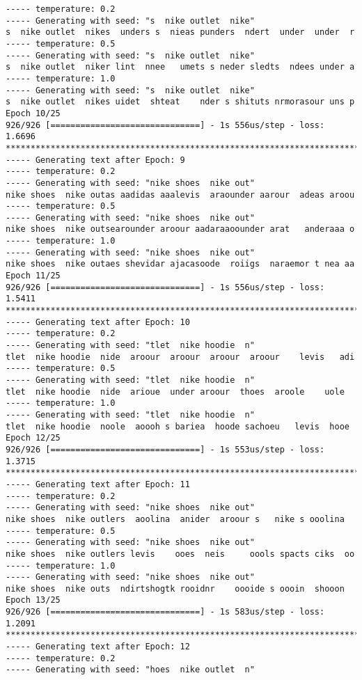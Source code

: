\documentclass[11pt]{article}
\begin{document}
\begin{Verbatim}[commandchars=\\\{\}]
----- temperature: 0.2
----- Generating with seed: "s  nike outlet  nike"
s  nike outlet  nikes  unders s  nieas punders  ndert  under  under  r
----- temperature: 0.5
----- Generating with seed: "s  nike outlet  nike"
s  nike outlet  niker lint  nnee   umets s neder sledts  ndees under a
----- temperature: 1.0
----- Generating with seed: "s  nike outlet  nike"
s  nike outlet  nikes uidet  shteat    nder s shituts nrmorasour uns p
Epoch 10/25
926/926 [==============================] - 1s 556us/step - loss: 1.6696
****************************************************************************
----- Generating text after Epoch: 9
----- temperature: 0.2
----- Generating with seed: "nike shoes  nike out"
nike shoes  nike outas aadidas aaalevis  araounder aarour  adeas aroou
----- temperature: 0.5
----- Generating with seed: "nike shoes  nike out"
nike shoes  nike outsearounder aroour aadaraaoounder arat   anderaaa o
----- temperature: 1.0
----- Generating with seed: "nike shoes  nike out"
nike shoes  nike outaes shevidar ajacasoode  roiigs  naraemor t nea aa
Epoch 11/25
926/926 [==============================] - 1s 556us/step - loss: 1.5411
****************************************************************************
----- Generating text after Epoch: 10
----- temperature: 0.2
----- Generating with seed: "tlet  nike hoodie  n"
tlet  nike hoodie  nide  aroour  aroour  aroour  aroour    levis   adi
----- temperature: 0.5
----- Generating with seed: "tlet  nike hoodie  n"
tlet  nike hoodie  nide  arioue  under aroour  thoes  aroole    uole
----- temperature: 1.0
----- Generating with seed: "tlet  nike hoodie  n"
tlet  nike hoodie  noole  aoooh s bariea  hoode sachoeu   levis  hooe
Epoch 12/25
926/926 [==============================] - 1s 553us/step - loss: 1.3715
****************************************************************************
----- Generating text after Epoch: 11
----- temperature: 0.2
----- Generating with seed: "nike shoes  nike out"
nike shoes  nike outlers  aoolina  anider  aroour s   nike s ooolina
----- temperature: 0.5
----- Generating with seed: "nike shoes  nike out"
nike shoes  nike outlers levis    ooes  neis     oools spacts ciks  oo
----- temperature: 1.0
----- Generating with seed: "nike shoes  nike out"
nike shoes  nike outs  ndirtshogtk rooidnr    oooide s oooin  shooon
Epoch 13/25
926/926 [==============================] - 1s 583us/step - loss: 1.2091
****************************************************************************
----- Generating text after Epoch: 12
----- temperature: 0.2
----- Generating with seed: "hoes  nike outlet  n"

\end{Verbatim}
\end{document}
